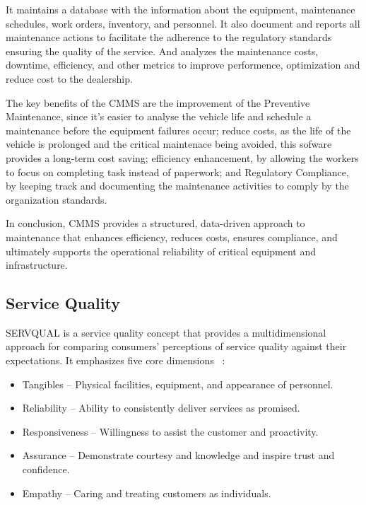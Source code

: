It maintains a database with the information about the equipment, maintenance schedules, work orders, inventory, and personnel. 
It also document and reports all maintenance actions to facilitate the adherence to the regulatory standards ensuring the quality of the service. 
And analyzes the maintenance costs, downtime, efficiency, and other metrics to improve performence, optimization and reduce cost to the dealership.

The key benefits of the \ac{CMMS} are the improvement of the Preventive Maintenance, since it's easier to analyse the vehicle life and schedule a maintenance before the equipment failures occur; reduce costs, as the life of the vehicle is prolonged and the critical maintenace being avoided, this sofware provides a long-term cost saving; efficiency enhancement, by allowing the workers to focus on completing task instead of paperwork; and Regulatory Compliance, by keeping track and documenting the maintenance activities to comply by the organization standards. 

In conclusion, \ac{CMMS} provides a structured, data-driven approach to maintenance that enhances efficiency, reduces costs, ensures compliance, and ultimately supports the operational reliability of critical equipment and infrastructure.





\subsection{Service Quality}
SERVQUAL is a service quality concept that provides a multidimensional approach for comparing consumers' perceptions of service quality against their expectations. 
It emphasizes five core dimensions ~\cite{SERVQUAL_OLD}:


\begin{itemize}
   \item Tangibles – Physical facilities, equipment, and appearance of personnel.
   \item Reliability – Ability to consistently deliver services as promised.
   \item Responsiveness – Willingness to assist the customer and proactivity.
   \item Assurance – Demonstrate courtesy and knowledge and inspire trust and confidence.
   \item Empathy – Caring and treating customers as individuals.
  \end{itemize}


